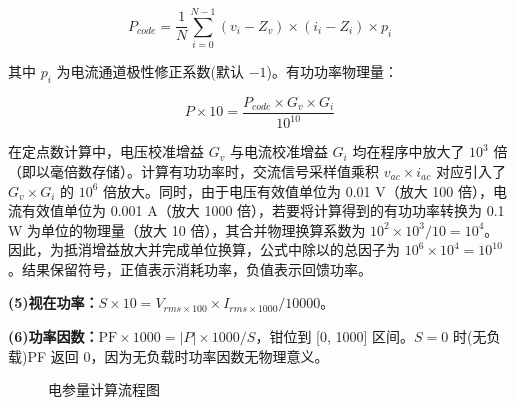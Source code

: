 \documentclass[UTF8,a4paper,zihao=-4,fontset=macnew]{ctexart}
\begin{document}
$$P_{code} = \frac{1}{N}\sum_{i=0}^{N-1}(v_i - Z_v) \times (i_i - Z_i) \times p_i$$

其中 $p_i$ 为电流通道极性修正系数(默认 $-1$)。有功功率物理量：

$$P \times 10 = \frac{P_{code} \times G_v \times G_i}{10^{10}}$$

在定点数计算中，电压校准增益 $G_v$ 与电流校准增益 $G_i$ 均在程序中放大了 $10^3$ 倍（即以毫倍数存储）。计算有功功率时，交流信号采样值乘积 $v_{ac} \times i_{ac}$ 对应引入了 $G_v \times G_i$ 的 $10^6$ 倍放大。同时，由于电压有效值单位为 0.01 V（放大 100 倍），电流有效值单位为 0.001 A（放大 1000 倍），若要将计算得到的有功功率转换为 0.1 W 为单位的物理量（放大 10 倍），其合并物理换算系数为 $10^2 \times 10^3 / 10 = 10^4$。因此，为抵消增益放大并完成单位换算，公式中除以的总因子为 $10^6 \times 10^4 = 10^{10}$。结果保留符号，正值表示消耗功率，负值表示回馈功率。

\textbf{(5)视在功率：}$S \times 10 = V_{rms\times100} \times I_{rms\times1000} / 10000$。

\textbf{(6)功率因数：}$\text{PF} \times 1000 = |P| \times 1000 / S$，钳位到 [0, 1000] 区间。$S = 0$ 时(无负载)PF 返回 0，因为无负载时功率因数无物理意义。

\begin{figure}[H]
\centering
{}
\caption{电参量计算流程图}
\label{fig:calc-flow}
\end{figure}
\end{document}
